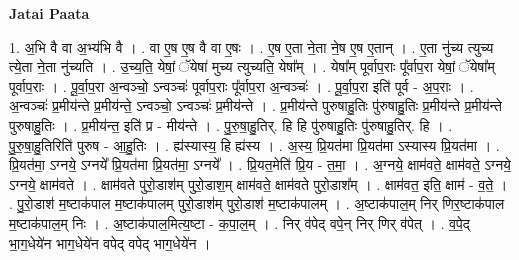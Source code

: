 \documentclass[17pt]{extarticle}
\begin{document}
\textbf{Jatai Paata} \newline

1. अ॒भि वै वा अ॒भ्य॑भि वै । . वा ए॒ष ए॒ष वै वा ए॒षः । . ए॒ष ए॒ता ने॒ता ने॒ष ए॒ष ए॒तान् । . ए॒ता नु॑च्य त्युच्य त्ये॒ता ने॒ता नु॑च्यति । . उ॒च्य॒ति॒ येषां॒ ॅयेषा॑ मुच्य त्युच्यति॒ येषा᳚म् । . येषा᳚म् पूर्वाप॒राः पू᳚र्वाप॒रा येषां॒ ॅयेषा᳚म् पूर्वाप॒राः । . पू॒र्वा॒प॒रा अ॒न्वञ्चो॒ ऽन्वञ्चः॑ पूर्वाप॒राः पू᳚र्वाप॒रा अ॒न्वञ्चः॑ । . पू॒र्वा॒प॒रा इति॑ पूर्व - अ॒प॒राः । . अ॒न्वञ्चः॑ प्र॒मीय॑न्ते प्र॒मीय॑न्ते॒ ऽन्वञ्चो॒ ऽन्वञ्चः॑ प्र॒मीय॑न्ते । . प्र॒मीय॑न्ते पुरुषाहु॒तिः पु॑रुषाहु॒तिः प्र॒मीय॑न्ते प्र॒मीय॑न्ते पुरुषाहु॒तिः । . प्र॒मीय॑न्त॒ इति॑ प्र - मीय॑न्ते । . पु॒रु॒षा॒हु॒तिर्. हि हि पु॑रुषाहु॒तिः पु॑रुषाहु॒तिर्. हि । . पु॒रु॒षा॒हु॒तिरिति॑ पुरुष - आ॒हु॒तिः । . ह्य॑स्यास्य॒ हि ह्य॑स्य । . अ॒स्य॒ प्रि॒यत॑मा प्रि॒यत॑मा ऽस्यास्य प्रि॒यत॑मा । . प्रि॒यत॑मा॒ ऽग्नये॒ ऽग्नये᳚ प्रि॒यत॑मा प्रि॒यत॑मा॒ ऽग्नये᳚ । . प्रि॒यत॒मेति॑ प्रि॒य - त॒मा॒ । . अ॒ग्नये॒ क्षाम॑वते॒ क्षाम॑वते॒ ऽग्नये॒ ऽग्नये॒ क्षाम॑वते । . क्षाम॑वते पुरो॒डाश॑म् पुरो॒डाश॒म् क्षाम॑वते॒ क्षाम॑वते पुरो॒डाश᳚म् । . क्षाम॑वत॒ इति॒ क्षाम॑ - व॒ते॒ । . पु॒रो॒डाश॑ म॒ष्टाक॑पाल म॒ष्टाक॑पालम् पुरो॒डाश॑म् पुरो॒डाश॑ म॒ष्टाक॑पालम् । . अ॒ष्टाक॑पाल॒म् निर् णिर॒ष्टाक॑पाल म॒ष्टाक॑पाल॒म् निः । . अ॒ष्टाक॑पाल॒मित्य॒ष्टा - क॒पा॒ल॒म् । . निर् व॑पेद् वपे॒न् निर् णिर् व॑पेत् । . व॒पे॒द् भा॒ग॒धेये॑न भाग॒धेये॑न वपेद् वपेद् भाग॒धेये॑न । \newline
\end{document}
